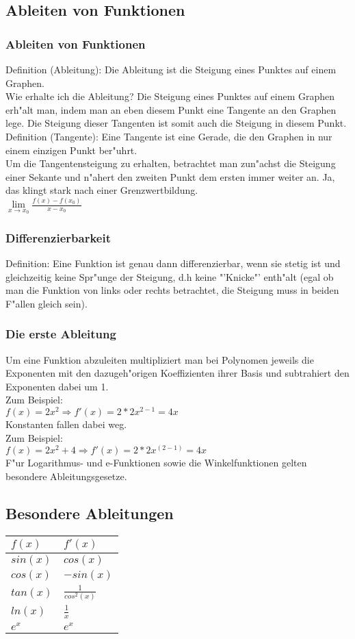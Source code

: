 \subsection{Ableiten von Funktionen}
\subsubsection{Ableiten von Funktionen}
Definition (Ableitung): Die Ableitung ist die Steigung eines Punktes auf einem Graphen.\\
Wie erhalte ich die Ableitung? Die Steigung eines Punktes auf einem Graphen erh"alt man, indem man an eben diesem Punkt eine Tangente an den Graphen lege. Die Steigung dieser Tangenten ist somit auch die Steigung in diesem Punkt.\\
Definition (Tangente): Eine Tangente ist eine Gerade, die den Graphen in nur einem einzigen Punkt ber"uhrt.\\
Um die Tangentensteigung zu erhalten, betrachtet man zun"achst die Steigung einer Sekante und n"ahert den zweiten Punkt dem ersten immer weiter an. Ja, das klingt stark nach einer Grenzwertbildung.\\
$ \lim\limits_{x\rightarrow x_0} \frac{f(x)-f(x_0)}{x-x_0}$
\subsubsection{Differenzierbarkeit}
Definition: Eine Funktion ist genau dann differenzierbar, wenn sie stetig ist und gleichzeitig keine Spr"unge der Steigung, d.h keine "'Knicke"' enth"alt (egal ob man die Funktion von links oder rechts betrachtet, die Steigung muss in beiden F"allen gleich sein).
\subsubsection{Die erste Ableitung}
Um eine Funktion abzuleiten multipliziert man bei Polynomen jeweils die Exponenten mit den dazugeh"origen Koeffizienten ihrer Basis und subtrahiert den Exponenten dabei um 1.\\
Zum Beispiel: \\
$f(x)=2x^2 \Rightarrow f'(x)=2*2x^{2-1}=4x$\\
Konstanten fallen dabei weg.\\
Zum Beispiel:\\
$f(x)=2x^2+4 \Rightarrow f'(x)=2*2x^(2-1)=4x$\\
F"ur Logarithmus- und e-Funktionen sowie die Winkelfunktionen gelten besondere Ableitungsgesetze.
\subsection{Besondere Ableitungen}
\begin{tabular}{|>{\centering\arraybackslash}p{6.5 cm}|>{\centering\arraybackslash}p{6.5 cm}|}
\hline
${f(x)}$&${f'(x)}$\\
\hline
$sin(x)$&$cos(x)$\\
\hline
$cos(x)$&$-sin(x)$\\
\hline
$tan(x)$&$\frac{1}{cos^2(x)}$\\
\hline
$ln(x)$&$\frac{1}{x}$\\
\hline
$e^x$&$e^x$\\
\hline
\end{tabular}
